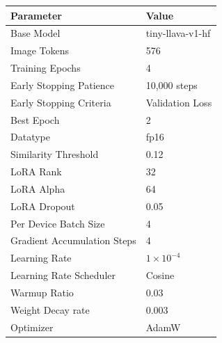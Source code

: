 \documentclass[11pt]{article}
\begin{document}
\begin{minipage}[t]{0.48\textwidth}
    \scriptsize
    \centering
    \label{tab:cos_train_config}
    \vspace{0.5em}
    \footnotesize
    \begin{tabular}{ll}
    \hline
    \textbf{Parameter}       & \textbf{Value}               \\
    \hline
    Base Model          & tiny-llava-v1-hf                            \\
    Image Tokens          & 576 \\
    Training Epochs          & 4                            \\
    Early Stopping Patience  & 10,000 steps
           \\
    Early Stopping Criteria  & Validation Loss
           \\
    Best Epoch               & 2
           \\
    Datatype                 & fp16               \\
    Similarity Threshold                & 0.12                            \\
    LoRA Rank                & 32                            \\
    LoRA Alpha                & 64                            \\
    LoRA Dropout             & 0.05                         \\
    Per Device Batch Size         & 4
    \\
    Gradient Accumulation Steps  & 4
    \\
    Learning Rate            & $1 \times 10^{-4}$ 
    \\
    Learning Rate Scheduler           & Cosine 
    \\

    Warmup Ratio                 & 0.03                \\
    Weight Decay rate                 & 0.003                \\
    Optimizer                & AdamW  \\
    \hline
    \end{tabular}
\end{minipage}
\hfill
\end{document}
